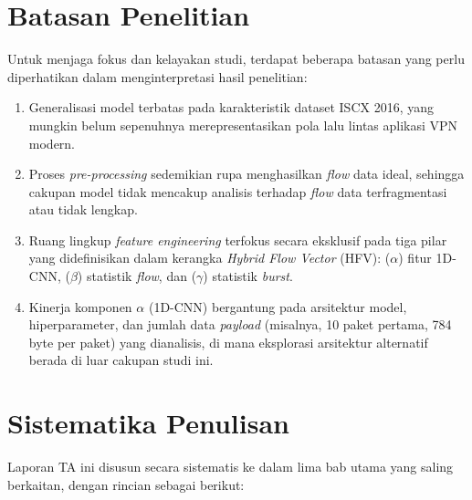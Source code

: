 \section{Batasan Penelitian}
\label{sec:ruang_lingkup}
Untuk menjaga fokus dan kelayakan studi, terdapat beberapa batasan yang perlu diperhatikan dalam menginterpretasi hasil penelitian:
\begin{enumerate}
    \item Generalisasi model terbatas pada karakteristik dataset ISCX 2016, yang mungkin belum sepenuhnya merepresentasikan pola lalu lintas aplikasi VPN modern.
    
    \item Proses \textit{pre-processing} sedemikian rupa menghasilkan \textit{flow} data ideal, sehingga cakupan model tidak mencakup analisis terhadap \textit{flow} data terfragmentasi atau tidak lengkap.
    
    \item Ruang lingkup \textit{feature engineering} terfokus secara eksklusif pada tiga pilar yang didefinisikan dalam kerangka \textit{Hybrid Flow Vector} (HFV): ($\alpha$) fitur 1D-CNN, ($\beta$) statistik \textit{flow}, dan ($\gamma$) statistik \textit{burst}.
    
    \item Kinerja komponen $\alpha$ (1D-CNN) bergantung pada arsitektur model, hiperparameter, dan jumlah data \textit{payload} (misalnya, 10 paket pertama, 784 byte per paket) yang dianalisis, di mana eksplorasi arsitektur alternatif berada di luar cakupan studi ini.
\end{enumerate}

\section{Sistematika Penulisan}
\label{sec:sistematika}
Laporan \ac{TA} ini disusun secara sistematis ke dalam lima bab utama yang saling berkaitan, dengan rincian sebagai berikut:

